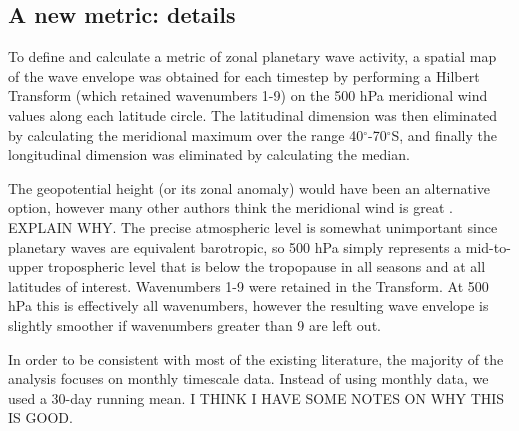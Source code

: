 \subsection{A new metric: details}

To define and calculate a metric of zonal planetary wave activity, a spatial map of the wave envelope was obtained for each timestep by performing a Hilbert Transform (which retained wavenumbers 1-9) on the 500 hPa meridional wind values along each latitude circle. The latitudinal dimension was then eliminated by calculating the meridional maximum over the range 40$^{\circ}$-70$^{\circ}$S, and finally the longitudinal dimension was eliminated by calculating the median.


The geopotential height (or its zonal anomaly) would have been an alternative option, however many other authors think the meridional wind is great \citep[e.g.]{Hope2014}. EXPLAIN WHY. The precise atmospheric level is somewhat unimportant since planetary waves are equivalent barotropic, so 500 hPa simply represents a mid-to-upper tropospheric level that is below the tropopause in all seasons and at all latitudes of interest. Wavenumbers 1-9 were retained in the Transform. At 500 hPa this is effectively all wavenumbers, however the resulting wave envelope is slightly smoother if wavenumbers greater than 9 are left out.



In order to be consistent with most of the existing literature, the majority of the analysis focuses on monthly timescale data. Instead of using monthly data, we used a 30-day running mean. I THINK I HAVE SOME NOTES ON WHY THIS IS GOOD.

